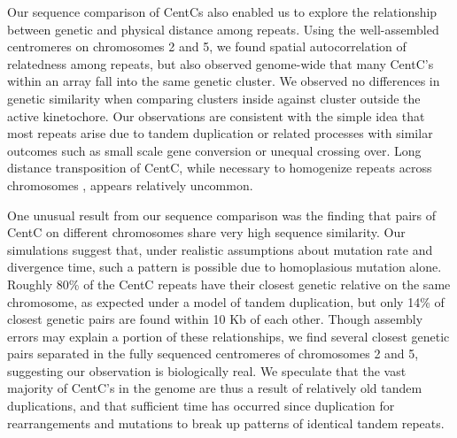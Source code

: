 
Our sequence comparison of CentCs also enabled us to explore the relationship between genetic and physical distance among repeats.  
Using the well-assembled centromeres on chromosomes 2 and 5, we found spatial autocorrelation of relatedness among repeats, but also observed genome-wide that many CentC’s within an array fall into the same genetic cluster.
We observed no differences in genetic similarity when comparing clusters inside against cluster outside the active kinetochore.
Our observations are consistent with the simple idea that most repeats arise due to tandem duplication or related processes with similar outcomes such as small scale gene conversion or unequal crossing over.
Long distance transposition of CentC, while necessary to homogenize repeats across chromosomes \citep{Shi2010}, appears relatively uncommon.

One unusual result from our sequence comparison was the finding that pairs of CentC on different chromosomes share very high sequence similarity.  
Our simulations suggest that, under realistic assumptions about mutation rate and divergence time, such a pattern is possible due to homoplasious mutation alone.  
Roughly 80\% of the CentC repeats have their closest genetic relative on the same chromosome, as expected under a model of tandem duplication, but only 14\% of closest genetic pairs are found within 10 Kb of each other.
Though assembly errors may explain a portion of these relationships, we find several closest genetic pairs separated in the fully sequenced centromeres of chromosomes 2 and 5, suggesting our observation is biologically real.
We speculate that the vast majority of  CentC’s in the genome are thus a result of relatively old tandem duplications, and that sufficient time has occurred since duplication for rearrangements and mutations to break up patterns of identical tandem repeats.




